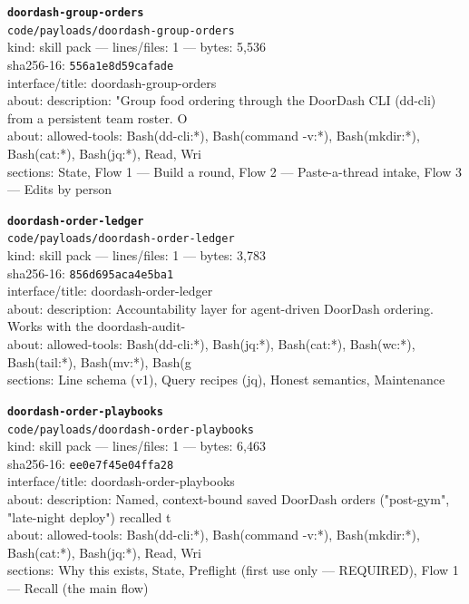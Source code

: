 \noindent\textbf{\texttt{doordash-group-orders}}\\
\texttt{code/payloads/doordash-group-orders}\\
kind: skill pack --- lines/files: 1 --- bytes: 5,536\\
sha256-16: \texttt{556a1e8d59cafade}\\
interface/title: doordash-group-orders\\
about: description: "Group food ordering through the DoorDash CLI (dd-cli) from a persistent team roster. O\\
about: allowed-tools: Bash(dd-cli:*), Bash(command -v:*), Bash(mkdir:*), Bash(cat:*), Bash(jq:*), Read, Wri\\
sections: State, Flow 1 — Build a round, Flow 2 — Paste-a-thread intake, Flow 3 — Edits by person\\
\vspace*{6.0pt}

\noindent\textbf{\texttt{doordash-order-ledger}}\\
\texttt{code/payloads/doordash-order-ledger}\\
kind: skill pack --- lines/files: 1 --- bytes: 3,783\\
sha256-16: \texttt{856d695aca4e5ba1}\\
interface/title: doordash-order-ledger\\
about: description: Accountability layer for agent-driven DoorDash ordering. Works with the doordash-audit-\\
about: allowed-tools: Bash(dd-cli:*), Bash(jq:*), Bash(cat:*), Bash(wc:*), Bash(tail:*), Bash(mv:*), Bash(g\\
sections: Line schema (v1), Query recipes (jq), Honest semantics, Maintenance\\
\vspace*{6.0pt}

\noindent\textbf{\texttt{doordash-order-playbooks}}\\
\texttt{code/payloads/doordash-order-playbooks}\\
kind: skill pack --- lines/files: 1 --- bytes: 6,463\\
sha256-16: \texttt{ee0e7f45e04ffa28}\\
interface/title: doordash-order-playbooks\\
about: description: Named, context-bound saved DoorDash orders ("post-gym", "late-night deploy") recalled t\\
about: allowed-tools: Bash(dd-cli:*), Bash(command -v:*), Bash(mkdir:*), Bash(cat:*), Bash(jq:*), Read, Wri\\
sections: Why this exists, State, Preflight (first use only — REQUIRED), Flow 1 — Recall (the main flow)\\
\vspace*{6.0pt}
\newpage

